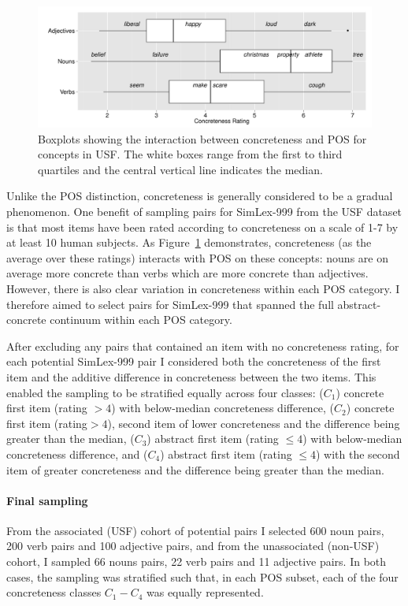 \begin{figure}[ht]  \includegraphics[width = \textwidth]{Chapter_2/Figure_1_CL}  \caption{\label{fig1} Boxplots showing the interaction between concreteness and POS for concepts in USF. The white boxes range from the first to third quartiles and the central vertical line indicates the median.}\end{figure}  

Unlike the POS distinction, concreteness  is generally considered to be a gradual phenomenon. One benefit of sampling pairs for SimLex-999 from the USF dataset is that most items have been rated according to concreteness on a scale of 1-7 by at least 10 human subjects. As Figure~\ref{fig1} demonstrates, concreteness (as the average over these ratings) interacts with POS on these concepts: nouns are on average more concrete than verbs which are more concrete than adjectives. However, there is also clear variation in concreteness within each POS category. I therefore aimed to select pairs for SimLex-999 that spanned the full abstract-concrete continuum within each POS category. 

After excluding any pairs that contained an item with no concreteness rating, for each potential SimLex-999 pair I considered both the concreteness of the first item and the additive difference in concreteness between the two items. This enabled the sampling to be stratified equally across four classes: (\( C_1\)) concrete first item (rating \(> 4\)) with below-median concreteness difference, (\( C_2\)) concrete first item (rating\( > 4\)), second item of lower concreteness and the difference being greater than the median, (\( C_3\)) abstract first item (rating \( \leq 4\)) with below-median concreteness difference, and (\( C_4\)) abstract first item (rating \(\leq 4\)) with the second item of greater concreteness and the difference being greater than the median. 

\paragraph{Final sampling} From the associated (USF) cohort of potential pairs I selected 600 noun pairs, 200 verb pairs and 100 adjective pairs, and from the unassociated (non-USF) cohort, I sampled 66 nouns pairs, 22 verb pairs and 11 adjective pairs. In both cases, the sampling was stratified such that, in each POS subset, each of the four concreteness classes \(C_1 - C_4\) was equally represented. 

